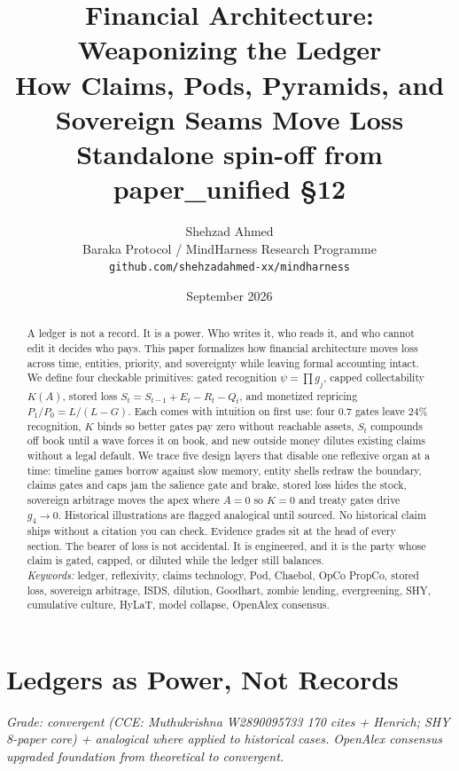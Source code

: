 \documentclass[11pt]{article}
\title{Financial Architecture: Weaponizing the Ledger\\[4pt]
\large How Claims, Pods, Pyramids, and Sovereign Seams Move Loss\\[4pt]
\normalsize Standalone spin-off from paper\_unified \S12}
\author{Shehzad Ahmed \\ \small Baraka Protocol / MindHarness Research Programme \\ \small \texttt{github.com/shehzadahmed-xx/mindharness}}
\date{September 2026}
\begin{document}
\maketitle

\begin{abstract}
A ledger is not a record. It is a power. Who writes it, who reads it, and who cannot edit it decides who pays. This paper formalizes how financial architecture moves loss across time, entities, priority, and sovereignty while leaving formal accounting intact. We define four checkable primitives: gated recognition $\psi=\prod g_j$, capped collectability $K(A)$, stored loss $S_t=S_{t-1}+E_t-R_t-Q_t$, and monetized repricing $P_1/P_0=L/(L-G)$. Each comes with intuition on first use: four $0.7$ gates leave $24\%$ recognition, $K$ binds so better gates pay zero without reachable assets, $S_t$ compounds off book until a wave forces it on book, and new outside money dilutes existing claims without a legal default. We trace five design layers that disable one reflexive organ at a time: timeline games borrow against slow memory, entity shells redraw the boundary, claims gates and caps jam the salience gate and brake, stored loss hides the stock, sovereign arbitrage moves the apex where $A=0$ so $K=0$ and treaty gates drive $g_4\to0$. Historical illustrations are flagged analogical until sourced. No historical claim ships without a citation you can check. Evidence grades sit at the head of every section. The bearer of loss is not accidental. It is engineered, and it is the party whose claim is gated, capped, or diluted while the ledger still balances.\\[4pt]
\textit{Keywords:} ledger, reflexivity, claims technology, Pod, Chaebol, OpCo PropCo, stored loss, sovereign arbitrage, ISDS, dilution, Goodhart, zombie lending, evergreening, SHY, cumulative culture, HyLaT, model collapse, OpenAlex consensus.
\end{abstract}

\tableofcontents
\newpage

\section{Ledgers as Power, Not Records}
\label{sec:ledgers-power}

\textit{Grade: convergent (CCE: Muthukrishna W2890095733 170 cites + Henrich; SHY 8-paper core) + analogical where applied to historical cases. OpenAlex consensus upgraded foundation from theoretical to convergent.}
\end{document}
